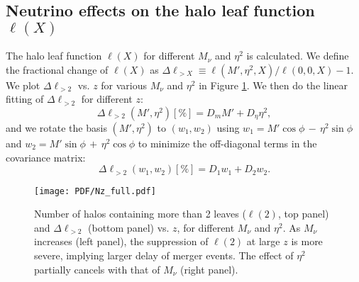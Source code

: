 \subsection{Neutrino effects on the halo leaf function $\ell(X)$}
The halo leaf function $\ell(X)$ for different $M_\nu$ and $\eta^2$ is calculated.
We define the fractional change of $\ell(X)$ as $\Delta \ell_{>X} \equiv \ell(M', \eta^2, X) /\ell(0, 0, X) - 1$.
We plot $\Delta \ell_{>2}$ vs. $z$ for various $M_\nu$ and $\eta^2$ in Figure \ref{fig:N_x}. We then do the linear fitting of $\Delta \ell_{>2}$ for different $z$:
\begin{equation}
\label{eq:reg_dN}
    \Delta \ell_{>2}(M', \eta^2)[\%] = D_m  M' + D_\eta\eta^2,
\end{equation}
and we rotate the basis $(M', \eta^2)$ to $(w_1, w_2)$ using $w_1 = M' \cos \phi\, -\, \eta^2 \sin \phi$ and $w_2 = M' \sin \phi \,+\, \eta^2 \cos \phi$ to minimize the off-diagonal terms in the covariance matrix:\
\begin{equation}
\label{eq:reg_dN_w}
    \Delta \ell_{>2}(w_1, w_2)[\%]= D_1 w_1 + D_2 w_2.
\end{equation}
\begin{figure}[!h]
		\begin{center}%
		\texttt{[image: PDF/Nz\_full.pdf]}
		\caption{\label{fig:N_x}Number of halos containing more than 2 leaves ($\ell(2)$, top panel) and $\Delta \ell_{>2}$ (bottom panel) vs. $z$, for different $M_\nu$ and $\eta^2$.  As $M_\nu$ increases (left panel), the suppression of $\ell(2)$ at large $z$ is more severe, implying larger delay of  merger events. The effect of $\eta^2$ partially cancels with that of $M_\nu$ (right panel). }
		\end{center}
\end{figure}
